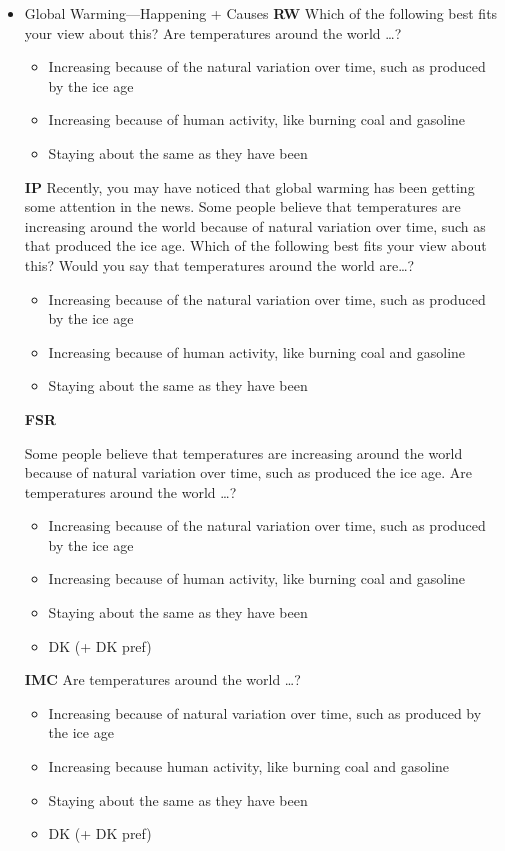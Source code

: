 \begin{itemize}
\item Global Warming—Happening + Causes\newline
\textbf{RW}\newline
Which of the following best fits your view about this? Are temperatures around the
world \ldots?
\begin{itemize}
	\item Increasing because of the natural variation over time, such as produced by the ice age
	\item Increasing because of human activity, like burning coal and gasoline
	\item Staying about the same as they have been
\end{itemize}

\textbf{IP}\newline
Recently, you may have noticed that global warming has been getting some attention
in the news. Some people believe that temperatures are increasing around the world
because of natural variation over time, such as that produced the ice age. Which of the
following best fits your view about this? Would you say that temperatures around the
world are\ldots?
\begin{itemize}
	\item Increasing because of the natural variation over time, such as produced by the ice age
	\item Increasing because of human activity, like burning coal and gasoline
	\item Staying about the same as they have been
\end{itemize}

\textbf{FSR}\newline

Some people believe that temperatures are increasing around the world because of
natural variation over time, such as produced the ice age. Are temperatures around
the world \ldots?
\begin{itemize}
	\item Increasing because of the natural variation over time, such as produced by the ice age
	\item Increasing because of human activity, like burning coal and gasoline
	\item Staying about the same as they have been
	\item DK (+ DK pref)
\end{itemize}

\textbf{IMC}\newline
Are temperatures around the world \ldots?
\begin{itemize}
	\item Increasing because of natural variation over time, such as produced by the ice age
	\item Increasing because human activity, like burning coal and gasoline
	\item Staying about the same as they have been
	\item DK (+ DK pref)
\end{itemize}


\end{itemize}
